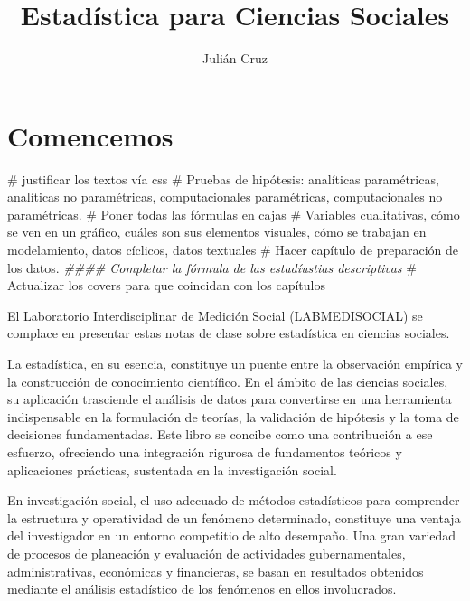 \documentclass[
  letterpaper,
  DIV=11,
  numbers=noendperiod]{scrreprt}
\title{Estadística para Ciencias Sociales}
\author{Julián Cruz}
\date{}
\newenvironment{Shaded}{\begin{snugshade}}{\end{snugshade}}
\newcommand{\CommentTok}[1]{\textcolor[rgb]{0.37,0.37,0.37}{#1}}
\newcommand{\DocumentationTok}[1]{\textcolor[rgb]{0.37,0.37,0.37}{\textit{#1}}}
\renewcommand*\contentsname{Table of contents}
\newcommand\contentsname{Table of contents}
\begin{document}
\maketitle

\renewcommand*\contentsname{Table of contents}
{
\hypersetup{linkcolor=}
\setcounter{tocdepth}{2}
\tableofcontents
}


\chapter*{Comencemos}\label{comencemos}


\begin{Shaded}
\begin{Highlighting}[]
\CommentTok{\# justificar los textos vía css}
\CommentTok{\# Pruebas de hipótesis: analíticas paramétricas, analíticas no paramétricas, computacionales paramétricas, computacionales no paramétricas.}
\CommentTok{\# Poner todas las fórmulas en cajas}
\CommentTok{\# Variables cualitativas, cómo se ven en un gráfico, cuáles son sus elementos visuales, cómo se trabajan en modelamiento, datos cíclicos, datos textuales}
\CommentTok{\# Hacer capítulo de preparación de los datos.}
\DocumentationTok{\#\#\#\# Completar la fórmula de las estadíustias descriptivas}
\CommentTok{\# Actualizar los covers para que coincidan con los capítulos}
\end{Highlighting}
\end{Shaded}

El Laboratorio Interdisciplinar de Medición Social (LABMEDISOCIAL) se
complace en presentar estas notas de clase sobre estadística en ciencias
sociales.

La estadística, en su esencia, constituye un puente entre la observación
empírica y la construcción de conocimiento científico. En el ámbito de
las ciencias sociales, su aplicación trasciende el análisis de datos
para convertirse en una herramienta indispensable en la formulación de
teorías, la validación de hipótesis y la toma de decisiones
fundamentadas. Este libro se concibe como una contribución a ese
esfuerzo, ofreciendo una integración rigurosa de fundamentos teóricos y
aplicaciones prácticas, sustentada en la investigación social.

En investigación social, el uso adecuado de métodos estadísticos para
comprender la estructura y operatividad de un fenómeno determinado,
constituye una ventaja del investigador en un entorno competitio de alto
desempaño. Una gran variedad de procesos de planeación y evaluación de
actividades gubernamentales, administrativas, económicas y financieras,
se basan en resultados obtenidos mediante el análisis estadístico de los
fenómenos en ellos involucrados.
\end{document}
